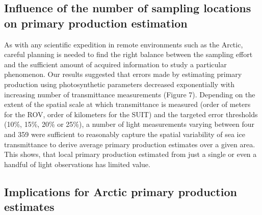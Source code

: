 \subsection{Influence of the number of sampling locations on primary production estimation}

As with any scientific expedition in remote environments such as the Arctic, careful planning is needed to find the right balance between the sampling effort and the sufficient  amount of acquired information to study a particular phenomenon. Our results suggested that errors made by estimating primary production using photosynthetic parameters decreased exponentially with increasing number of transmittance measurements (Figure 7). Depending on the extent of the spatial scale at which transmittance is measured (order of meters for the ROV, order of kilometers for the SUIT) and the targeted error thresholds (10\%, 15\%, 20\% or 25\%), a number of light measurements varying between four and 359 were sufficient to reasonably capture the spatial variability of sea ice transmittance to derive average primary production estimates over a given area. This shows, that local primary production estimated from just a single or even a handful of light observations has limited value.

\subsection{Implications for Arctic primary production estimates}

